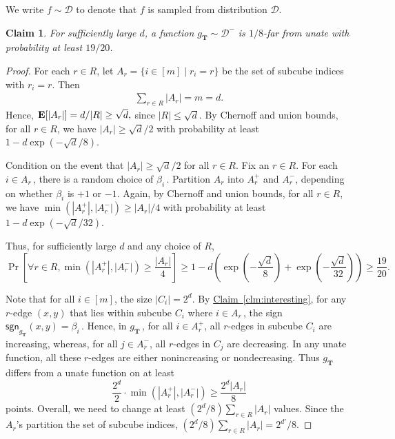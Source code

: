 \documentclass[11pt]{article}
\numberwithin{equation}{section}
\newtheorem{claim}[theorem]{Claim}
\theoremstyle{definition}
\theoremstyle{plain}
\newcommand{\expref}[2]{\hyperref[#2]{#1~\ref{#2}}}
\DeclareMathOperator{\E}{\hbox{\bf E}}
\newcommand{\bT}{\ensuremath{\mathbf{T}}}
\newcommand{\cD}{\ensuremath{\mathcal{D}}}
\newcommand{\No}{\ensuremath{\mathcal{D}^-}}
\newcommand{\sgn}{\mathsf{sgn}}
\newcommand{\Clm}[1]{\expref{Claim}{clm:#1}}
\begin{document}
We write $f \sim \cD$ to denote that $f$ is sampled from distribution $\cD$.

\begin{claim}\label{clm:no}
For sufficiently large $d$, a function $g_{\bT} \sim \No$ is $1/8$-far from unate with probability at least $19/20$.
\end{claim}

\begin{proof}
%
For each $r \in R$, let $A_r = \{ i \in [m] \mid r_i = r \}$ be the set of subcube indices with $r_i = r$.
Then
\begin{align}
\sum\limits_{r \in R} |A_r| = m = d \label{eqn:A_r}.
\end{align}
Hence, $\E[|A_r|] = d/|R| \geq \sqrt{d},$
since $|R| \leq \sqrt{d}$. By Chernoff and union bounds, for all $r \in R$,
we have $|A_r| \geq \sqrt{d}/2$	with probability at least $1 - d\exp(-\sqrt{d}/8)$.
	
Condition on the event that $|A_r| \geq \sqrt{d}/2$ for all $r \in R$.
Fix an $r \in R$.
For each $i \in A_r$\,, %
there is a random choice of $\beta_i$\,. %
Partition $A_r$ into $A^+_r$ and $A^-_r$,
depending on whether $\beta_i$ is
%
%
$+1$ or $-1$.   %
Again, by Chernoff and union bounds, for all $r \in R$, we have $\min(|A^+_r|,|A^-_r|) \geq |A_r|/4$ with probability at least $1-d\exp(-\sqrt{d}/32)$.

Thus, for sufficiently large $d$ and any choice of $R$,
\[
\Pr \left[\forall r \in R, \min(|A_r^+|, |A_r^-|) \geq \frac{|A_r|}{4} \right] \geq 1 - d\left(\exp \left(-\frac{\sqrt{d}}{8} \right) + \exp \left(-\frac{\sqrt{d}}{32} \right) \right) \geq \frac{19}{20}.
\]


%
Note that for all $i \in [m]$, the size $|C_i| = 2^d$.
By \Clm{interesting}, for any $r$-edge $(x,y)$ that lies within 
subcube $C_i$ where $i \in A_r$\,, %
the sign $\sgn_{g_{\bT}}(x,y) = \beta_i$\,. %
Hence, in $g_{\bT}$\,,  %
for all $i \in A^+_r$, all $r$-edges in subcube $C_i$ are increasing, whereas, for all $j \in A^-_r$, all $r$-edges in $C_j$ are decreasing.
In any unate function, all these $r$-edges are either nonincreasing or nondecreasing.
Thus $g_{\bT}$ differs from a unate function on at least
\[
  \frac{2^d}{2} \cdot \min(|A^+_r|,|A^-_r|) \geq \frac{2^d |A_r|}{8}
\]
points.  Overall, we need to change at least
$({2^d}/{8})\sum_{r \in R} |A_r|$ values. Since the $A_r$'s
partition the set of subcube indices,
$({2^d}/{8}) \sum_{r \in R} |A_r| = {2^{d'}}/{8}$.
\end{proof}
\end{document}
